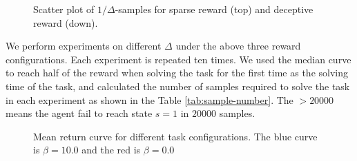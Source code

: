 \begin{figure}[!htb]
    \centering
    \caption{Scatter plot of $1/\Delta$-samples for sparse reward (top) and deceptive reward (down).}
   \label{fig:H-sample} 
\end{figure}
We perform experiments on different $ \Delta $ under the above three reward configurations. Each experiment is repeated ten times. We used the median curve to reach half of the reward when solving the task for the first time as the solving time of the task, and calculated the number of samples required to solve the task in each experiment as shown in the Table \ref{tab:sample-number}. The $>20000$ means the agent fail to reach state $s=1$ in $20000$ samples.

\begin{figure}[!htb]
    \centering
    \caption{Mean return curve for different task configurations. The blue curve is $\beta = 10.0$ and the red is $\beta = 0.0$}
   \label{fig:A-f} 
\end{figure}

